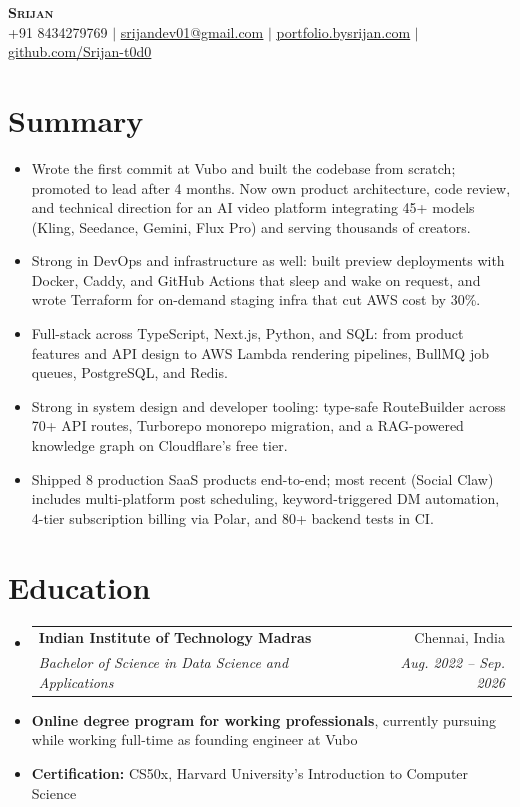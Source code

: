 \documentclass[letterpaper,11pt]{article}
\makeatletter
\newcommand{\resumeItem}[1]{
  \item\small{
    {#1 \vspace{-2pt}}
  }
}
\newcommand{\resumeSubheading}[4]{
  \vspace{-2pt}\item
    \begin{tabular*}{0.97\textwidth}[t]{l@{\extracolsep{\fill}}r}
      \textbf{#1} & #2 \\
      \textit{\small#3} & \textit{\small #4} \\
    \end{tabular*}\vspace{-7pt}
}
\newcommand{\resumeSubItem}[1]{\resumeItem{#1}\vspace{-4pt}}
\newcommand{\resumeSubHeadingListStart}{\begin{itemize}[leftmargin=0.15in, label={}]}
\newcommand{\resumeSubHeadingListEnd}{\end{itemize}}
\newcommand{\resumeItemListStart}{\begin{itemize}}
\newcommand{\resumeItemListEnd}{\end{itemize}\vspace{-5pt}}
\makeatother
\begin{document}
\begin{center}
    \textbf{\Huge \scshape Srijan} \\ \vspace{1pt}
    \small +91 8434279769 $|$ \href{mailto:srijandev01@gmail.com}{\underline{srijandev01@gmail.com}} $|$
    \href{https://portfolio.bysrijan.com}{\underline{portfolio.bysrijan.com}} $|$
    \href{https://github.com/Srijan-t0d0}{\underline{github.com/Srijan-t0d0}}
\end{center}

\section{Summary}
\resumeItemListStart
\resumeItem{Wrote the first commit at Vubo and built the codebase from scratch; promoted to lead after 4 months. Now own product architecture, code review, and technical direction for an AI video platform integrating 45+ models (Kling, Seedance, Gemini, Flux Pro) and serving thousands of creators.}
\resumeItem{Strong in DevOps and infrastructure as well: built preview deployments with Docker, Caddy, and GitHub Actions that sleep and wake on request, and wrote Terraform for on-demand staging infra that cut AWS cost by 30\%.}
\resumeItem{Full-stack across TypeScript, Next.js, Python, and SQL: from product features and API design to AWS Lambda rendering pipelines, BullMQ job queues, PostgreSQL, and Redis.}
\resumeItem{Strong in system design and developer tooling: type-safe RouteBuilder across 70+ API routes, Turborepo monorepo migration, and a RAG-powered knowledge graph on Cloudflare's free tier.}
\resumeItem{Shipped 8 production SaaS products end-to-end; most recent (Social Claw) includes multi-platform post scheduling, keyword-triggered DM automation, 4-tier subscription billing via Polar, and 80+ backend tests in CI.}
\resumeItemListEnd

\section{Education}
  \resumeSubHeadingListStart
    \resumeSubheading
      {Indian Institute of Technology Madras}{Chennai, India}
      {Bachelor of Science in Data Science and Applications}{Aug. 2022 -- Sep. 2026}
    \resumeSubItem{\textbf{Online degree program for working professionals}, currently pursuing while working full-time as founding engineer at Vubo}
    \resumeSubItem{\textbf{Certification:} CS50x, Harvard University's Introduction to Computer Science}
  \resumeSubHeadingListEnd
\end{document}
